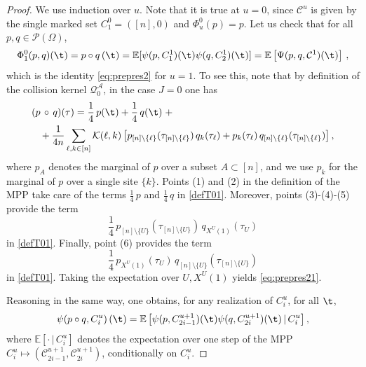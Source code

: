 \documentclass[11pt,reqno]{amsart}
\numberwithin{equation}{section}
\numberwithin{figure}{section}
\newcommand{\1}{\mathds{1}}
\newcommand{\tc}{\,|\,}
\let\O=\Omega
\newcommand{\cC}{\ensuremath{\mathcal C}}
\newcommand{\cP}{\ensuremath{\mathcal P}}
\newcommand{\bbE}{{\ensuremath{\mathbb E}} }
\begin{document}
\begin{proof}
We use induction over $u$. Note that it is true at $u=0$, since $\cC^u$ is given by the single marked set $C_1^0=([n],0)$ and $\Phi^0_u(p)=p$. Let us check that for all $p,q\in\cP(\O)$, 
 \begin{equation} \label{eq:prepres21}
\Phi^0_1(p,q)(\t)=p\circ q\,(\t)=\bbE[\psi(p,C_1^1)(\t)\psi(q,C_2^1)(\t)]=\bbE\left[\Psi(p,q,\cC^1)(\t)\right]\,,
\end{equation}
which is the identity \eqref{eq:prepres2} for $u=1$. 
To see this, note that
by definition of the collision kernel \(\mathcal{Q}_0^\mathcal{A}\), in the case $J=0$ one has
\begin{align}\label{defT01}
   & (p \,\circ\, q)(\tau)  = %
\frac14 \,p(\t)+\frac14\, q(\t)  \;+\nonumber \\
& \;\;\;  +\frac1{4n}  \sum_{\ell, k \in [n]} \mathcal{K}(\ell, k) \left[ p_{[n] \setminus \{\ell\}}(\tau_{[n] \setminus \{\ell\}}) \, q_k(\tau_\ell) + p_k(\tau_\ell) \, q_{[n] \setminus \{\ell\}}(\tau_{[n] \setminus \{\ell\}})\right],
\end{align}
where $p_A$ denotes the marginal of $p$ over a subset $A\subset[n]$, and we use $p_k$ for the marginal of $p$ over a single site $\{k\}$.
Points (1) and (2) in the definition of the MPP take care of the terms $\frac14\,p$ and $\frac14\,q$ in \eqref{defT01}.
Moreover, points (3)-(4)-(5) provide the term \[
\frac14\,p_{[n] \setminus \{U\}}(\tau_{[n] \setminus \{U\}}) \, q_{X^U(1)}(\tau_U)\] 
in \eqref{defT01}. Finally, point (6) provides the term \[\frac14\, p_{X^U(1)}(\tau_U)\,q_{[n] \setminus \{U\}}(\tau_{[n] \setminus \{U\}}) \] in \eqref{defT01}.
Taking the expectation over $U,X^U(1)$ yields \eqref{eq:prepres21}.
  
  Reasoning in the same way, one obtains, for any realization of $C^u_i$,  for all $\t$, 
  \begin{align}\label{defT01a}
   \psi(p\circ q,C^u_i)\,(\t)=
   \bbE\left[\psi(p,C^{u+1}_{2i-1})(\t)\psi(q,C^{u+1}_{2i})(\t)\tc C^u_i\right],
   \end{align}
   where $\bbE[\cdot\tc C^u_i]$ denotes the expectation over one step of the MPP  $C^u_i \mapsto (\cC^{u+1}_{2i-1},\cC^{u+1}_{2i})$, conditionally on $C^u_i$.  


\end{proof}
\end{document}
